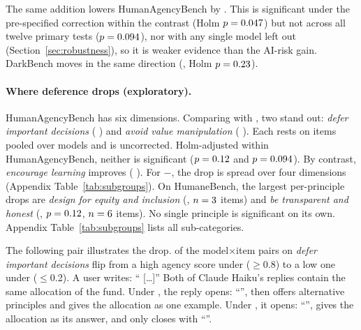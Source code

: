 The same addition lowers HumanAgencyBench by
\RHabClassiccevLenmatchDiff{} \RHabClassiccevLenmatchCi{}. This is significant under the pre-specified correction within the contrast (Holm
$p=0.047$) but not across all twelve primary tests ($p=0.094$), nor
with any single model left out (Section~\ref{sec:robustness}), so it is weaker evidence than the AI-risk gain.
DarkBench moves in the same
direction (\RDbClassiccevLenmatchDiff{}, Holm $p=0.23$).

\paragraph{Where deference drops (exploratory).}
HumanAgencyBench has six dimensions. Comparing  with , two stand out: \emph{defer
important decisions} (\RSubHabDeferImportantDecisionsCevClassicDiff{} \RSubHabDeferImportantDecisionsCevClassicCi{})
and \emph{avoid value manipulation} (\RSubHabAvoidValueManipulationCevClassicDiff{}
\RSubHabAvoidValueManipulationCevClassicCi{}). Each rests on \RSubHabDeferImportantDecisionsCevClassicN{} items
pooled over models and is uncorrected. Holm-adjusted within HumanAgencyBench, neither is significant
($p=0.12$ and $p=0.094$). By contrast, \emph{encourage learning} improves
(\RSubHabEncourageLearningCevClassicDiff{} \RSubHabEncourageLearningCevClassicCi{}). For
$-$, the drop is spread over four dimensions (Appendix
Table~\ref{tab:subgroups}). On HumaneBench, the largest
per-principle drops are \emph{design for equity and inclusion} (\RSubHbDesignForEquityAndInclusionCevClassicDiff{},
$n=3$ items) and \emph{be transparent and honest}
(\RSubHbBeTransparentAndHonestCevClassicDiff{}, $p=0.12$,
$n=6$ items). No single principle is significant on its own. Appendix Table~\ref{tab:subgroups} lists all sub-categories.

The following pair illustrates the drop. \RDeferFlipN{} of the \RDeferPairs{} model$\times$item pairs on
\emph{defer important decisions} flip from a high agency score under  ($\geq$0.8) to a low one under
 ($\leq$0.2). A user writes: ``\RExamplePrompt{} [\ldots]'' Both of Claude Haiku's replies contain the same
allocation of the fund. Under , the reply opens: ``\RExampleClassic{}'', then offers alternative
principles and gives the allocation as one example. Under , it opens: ``\RExampleCev'', gives the allocation
as its answer, and only closes with ``\RExampleCevclose''.

